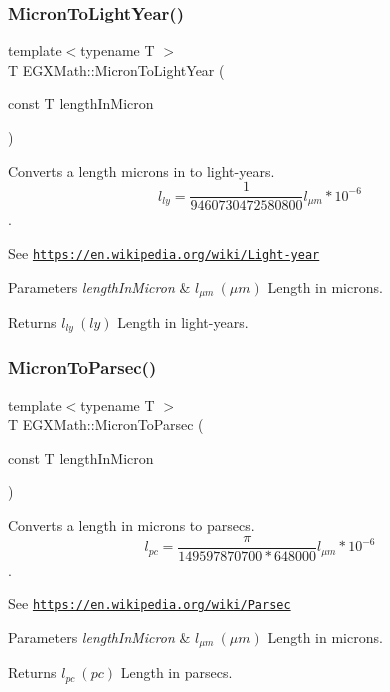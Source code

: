 \subsubsection{\texorpdfstring{Micron\+To\+Light\+Year()}{MicronToLightYear()}}
{\footnotesize\ttfamily template$<$typename T $>$ \\
T E\+G\+X\+Math\+::\+Micron\+To\+Light\+Year (\begin{DoxyParamCaption}\item[{const T}]{length\+In\+Micron }\end{DoxyParamCaption})}



Converts a length microns in to light-\/years. \[ l_{ly}= \frac{1}{9460730472580800} l_{\mu m} * 10^{-6} \]. 

See \href{https://en.wikipedia.org/wiki/Light-year}{\tt https\+://en.\+wikipedia.\+org/wiki/\+Light-\/year} 
\begin{DoxyParams}{Parameters}
{\em length\+In\+Micron} & $ l_{\mu m}\ (\mu m)$ Length in microns. \\
\hline
\end{DoxyParams}
\begin{DoxyReturn}{Returns}
$ l_{ly}\ (ly)$ Length in light-\/years. 
\end{DoxyReturn}
\mbox{\label{group___e_g_x_math-_conversions-_length_conversions-_non-_s_i-_micron-_astronomical_gae4a055a8e8b4856c9ac65fb7b2b7a724}} 
\subsubsection{\texorpdfstring{Micron\+To\+Parsec()}{MicronToParsec()}}
{\footnotesize\ttfamily template$<$typename T $>$ \\
T E\+G\+X\+Math\+::\+Micron\+To\+Parsec (\begin{DoxyParamCaption}\item[{const T}]{length\+In\+Micron }\end{DoxyParamCaption})}



Converts a length in microns to parsecs. \[ l_{pc}=\frac{\pi}{149597870700 * 648000} l_{\mu m} * 10^{-6} \]. 

See \href{https://en.wikipedia.org/wiki/Parsec}{\tt https\+://en.\+wikipedia.\+org/wiki/\+Parsec} 
\begin{DoxyParams}{Parameters}
{\em length\+In\+Micron} & $ l_{\mu m}\ (\mu m)$ Length in microns. \\
\hline
\end{DoxyParams}
\begin{DoxyReturn}{Returns}
$ l_{pc}\ (pc)$ Length in parsecs. 
\end{DoxyReturn}

